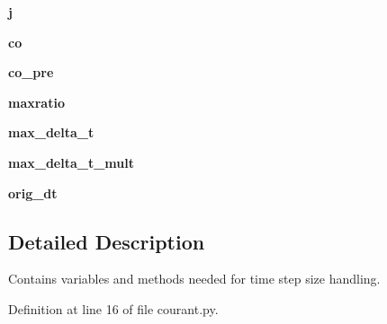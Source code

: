 \begin{DoxyCompactItemize}
\item 
\hypertarget{classsmoderp2d_1_1src_1_1courant_1_1Courant_ad7980557f43390dbafa7a32c2eb5587f}{{\bfseries j}}\label{classsmoderp2d_1_1src_1_1courant_1_1Courant_ad7980557f43390dbafa7a32c2eb5587f}

\item 
\hypertarget{classsmoderp2d_1_1src_1_1courant_1_1Courant_a1ce8167e370399dae153ffac1a9506cd}{{\bfseries co}}\label{classsmoderp2d_1_1src_1_1courant_1_1Courant_a1ce8167e370399dae153ffac1a9506cd}

\item 
\hypertarget{classsmoderp2d_1_1src_1_1courant_1_1Courant_ad30d2f98a2d53cac3e07e7e0b3cedd39}{{\bfseries co\-\_\-pre}}\label{classsmoderp2d_1_1src_1_1courant_1_1Courant_ad30d2f98a2d53cac3e07e7e0b3cedd39}

\item 
\hypertarget{classsmoderp2d_1_1src_1_1courant_1_1Courant_aca2e98eb52dc3dcd664209462b181ba1}{{\bfseries maxratio}}\label{classsmoderp2d_1_1src_1_1courant_1_1Courant_aca2e98eb52dc3dcd664209462b181ba1}

\item 
\hypertarget{classsmoderp2d_1_1src_1_1courant_1_1Courant_a03e5161b202d6d9ecaa2ab6bc2f6364c}{{\bfseries max\-\_\-delta\-\_\-t}}\label{classsmoderp2d_1_1src_1_1courant_1_1Courant_a03e5161b202d6d9ecaa2ab6bc2f6364c}

\item 
\hypertarget{classsmoderp2d_1_1src_1_1courant_1_1Courant_a4cd64dfec3bd294d881fd28581250b45}{{\bfseries max\-\_\-delta\-\_\-t\-\_\-mult}}\label{classsmoderp2d_1_1src_1_1courant_1_1Courant_a4cd64dfec3bd294d881fd28581250b45}

\item 
\hypertarget{classsmoderp2d_1_1src_1_1courant_1_1Courant_ae5af3c6c7c3c4a048d92af266d8abeca}{{\bfseries orig\-\_\-dt}}\label{classsmoderp2d_1_1src_1_1courant_1_1Courant_ae5af3c6c7c3c4a048d92af266d8abeca}

\end{DoxyCompactItemize}


\subsection{Detailed Description}
Contains variables and methods needed for time step size handling. 



Definition at line 16 of file courant.\-py.



